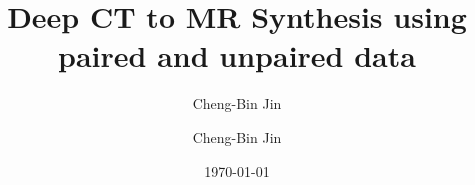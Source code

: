 \documentclass[11pt,letterpaper]{article}
\author{Cheng-Bin Jin}
\begin{document}
\title{Deep CT to MR Synthesis using paired and unpaired data}
\author{Cheng-Bin Jin}
\date{\today}
\maketitle
\end{document}
